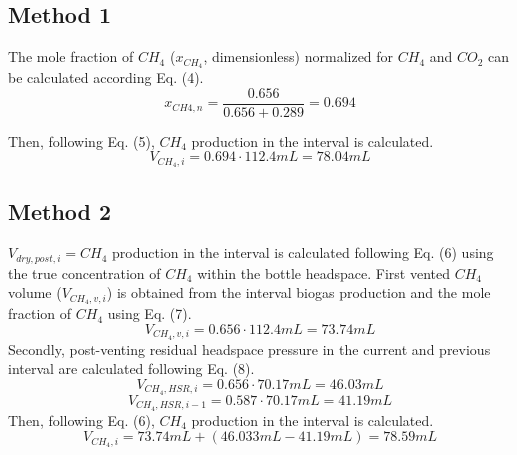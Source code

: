 \subsection{Method 1}
The mole fraction of $CH_{4}$ ($x_{CH_4}$, dimensionless) normalized for $CH_{4}$ and $CO_{2}$ can be calculated according Eq. (4).
\begin{equation*}
    x_{CH{4},n} = \frac{0.656}{0.656 + 0.289} = 0.694
\end{equation*}

Then, following Eq. (5), $CH_{4}$ production in the interval is calculated.
\begin{equation*}
  V_{CH_4, i} = 0.694 \cdot 112.4\unit{mL}  = 78.04\unit{mL} 
\end{equation*}

\subsection{Method 2}
$V_{dry,post,i} =CH_{4}$ production in the interval is calculated following Eq. (6) using the true concentration of $CH_{4}$ within the bottle headspace.
First vented $CH_{4}$ volume ($V_{CH_4, v,i}$) is obtained from the interval biogas production and the mole fraction of $CH_{4}$ using Eq. (7).
\begin{equation*}
  V_{CH_4, v, i} = 0.656 \cdot 112.4\unit{mL}  = 73.74\unit{mL} 
\end{equation*}
Secondly, post-venting residual headspace pressure in the current and previous interval are calculated following Eq. (8).
\begin{equation*}
  V_{CH_4, HSR, i} = 0.656 \cdot 70.17\unit{mL}  = 46.03\unit{mL} 
\end{equation*}
\begin{equation*}
  V_{CH_4, HSR, i-1} = 0.587 \cdot 70.17\unit{mL}  = 41.19\unit{mL} 
\end{equation*}
Then, following Eq. (6), $CH_{4}$ production in the interval is calculated.
\begin{equation*}
  V_{CH_{4},i} = 73.74\unit{mL} + (46.033\unit{mL} - 41.19\unit{mL})  = 78.59\unit{mL} 
\end{equation*}




